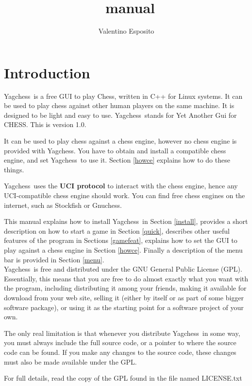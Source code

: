 \documentclass[a4paper]{article}
\title{\nameprog\ manual}
\author{Valentino Esposito}
\date{}
\newcommand{\nameprog}{Yagchess}
\newcommand{\version}{1.0}
\begin{document}
\maketitle

\tableofcontents

\section{Introduction}
\nameprog\ is a free GUI to play Chess, written in C++ for Linux systems. It can be used to play chess against other human players on the same machine.
It is designed to be light and easy to use. \nameprog\ stands for Yet Another Gui for CHESS. This is version \version.

It can be used to play chess against a chess engine, however no chess engine is provided with \nameprog. You have to obtain and install a compatible chess engine,
and set \nameprog\ to use it. Section \ref{howce} explains how to do these things.

\nameprog\ uses the \textbf{UCI protocol} to interact with the chess engine, hence any UCI-compatible chess engine should work.
You can find free chess engines on the internet, such as Stockfish or Gnuchess.

This manual explains how to install \nameprog\ in Section \ref{install}, provides a short description on how to start a game in Section \ref{quick}, describes
other useful features of the program in Sections \ref{gamefeat}, explains how to set the GUI to play against a chess engine in Section \ref{howce}. Finally a
description of the menu bar is provided in Section \ref{menu}.\\

\nameprog\ is free and distributed under the GNU General Public License (GPL). Essentially, this means that you are free
to do almost exactly what you want with the program, including distributing it among your friends, making it available for download from your web site,
selling it (either by itself or as part of some bigger software package), or using it as the starting point for a software project of your own.

The only real limitation is that whenever you distribute \nameprog\ in some way, you must always include the full source code,
or a pointer to where the source code can be found. If you make any changes to the source code, these changes must also be made available under the GPL.

For full details, read the copy of the GPL found in the file named LICENSE.txt
\end{document}
